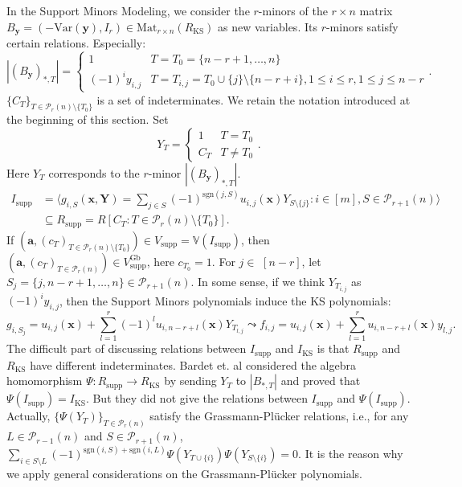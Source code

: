 \documentclass[a4paper, 11pt]{amsart}
\newcommand{\mc}[1]{\mathcal{#1}}
\newcommand{\mb}[1]{\mathbb{#1}}
\newcommand{\ideala}[1]{\langle{#1}\rangle}
\newcommand{\ssm}[1]{\sum_{#1}}
\newcommand{\td}[1]{\bm{#1}}
\newcommand{\tx}[1]{\text{#1}}
\theoremstyle{definition}
\theoremstyle{definition}
\begin{document}
	In the Support Minors Modeling, we consider the $r$-minors of the $r\times n$ matrix $B_{\td{y}}=(-\tx{Var}(\td{y}),I_r)\in\tx{Mat}_{r\times n}(R_{\tx{KS}})$ as new variables. Its $r$-minors satisfy certain relations. Especially:
	\begin{equation*}
		|(B_{\td{y}})_{*,T}|=\begin{cases}
			1&T=T_0=\{n-r+1,\dots,n\}\\
			(-1)^iy_{i,j}&T=T_{i,j}=T_0\cup\{j\}\setminus\{n-r+i\},1\leq i\leq r,1\leq j\leq n-r
		\end{cases}.
	\end{equation*}
	$\{C_T\}_{T\in\mc{P}_r(n)\setminus\{T_0\}}$ is a set of indeterminates. We retain the notation introduced at the beginning of this section. Set
	\begin{equation*}
		Y_T=\begin{cases}
			1&T=T_0\\
			C_T&T\neq T_0
		\end{cases}.
	\end{equation*}
	Here $Y_T$ corresponds to the $r$-minor $|(B_{\td{y}})_{*,T}|$.
	\begin{align*}
		I_{\tx{supp}}&=\ideala{g_{i,S}(\td{x},\td{Y})=\ssm{j\in S}(-1)^{\tx{sgn}(j,S)}u_{i,j}(\td{x})Y_{S\setminus\{j\}}:i\in[m],S\in\mc{P}_{r+1}(n)}\\
		&\subseteq R_{\tx{supp}}=R[C_T:T\in\mc{P}_r(n)\setminus\{T_0\}].
	\end{align*}
	If $(\td{a},(c_T)_{T\in\mc{P}_r(n)\setminus\{T_0\}})\in V_{\tx{supp}}=\mb{V}(I_{\tx{supp}})$, then $(\td{a},(c_T)_{T\in\mc{P}_r(n)})\in V^{\tx{Gb}}_{\tx{supp}}$, here $c_{T_0}=1$.
	For $j\in$ $[n-r]$, let $S_j=\{j,n-r+1,\dots,n\}\in\mc{P}_{r+1}(n)$. In some sense, if we think $Y_{T_{i,j}}$ as $(-1)^iy_{i,j}$, then the Support Minors polynomials induce the KS polynomials:
	\begin{equation*}
		g_{i,S_j}=u_{i,j}(\td{x})+\sum^r_{l=1}(-1)^lu_{i,n-r+l}(\td{x})Y_{T_{l,j}}\leadsto f_{i,j}=u_{i,j}(\td{x})+\sum^r_{l=1}u_{i,n-r+l}(\td{x})y_{l,j}.
	\end{equation*}
	The difficult part of discussing relations between $I_{\tx{supp}}$ and $I_{\tx{KS}}$ is that	$R_{\tx{supp}}$ and $R_{\tx{KS}}$ have different indeterminates. Bardet et. al \cite{GSM} considered the algebra homomorphism $\Psi:R_{\tx{supp}}\to R_{\tx{KS}}$ by sending $Y_T$ to $|B_{*,T}|$ and proved that $\Psi(I_{\tx{supp}})=I_{\tx{KS}}$. But they did not give the relations between $I_{\tx{supp}}$ and $\Psi(I_{\tx{supp}})$. Actually, $\{\Psi(Y_T)\}_{T\in\mc{P}_r(n)}$ satisfy the Grassmann-Plücker relations, i.e., for any $L\in\mc{P}_{r-1}(n)$ and $S\in\mc{P}_{r+1}(n)$, $\ssm{i\in S\setminus L}(-1)^{\tx{sgn}(i,S)+\tx{sgn}(i,L)}\Psi(Y_{T\cup\{i\}})\Psi(Y_{S\setminus\{i\}})=0$. It is the reason why we apply general considerations on the Grassmann-Plücker polynomials.
	
\end{document}
